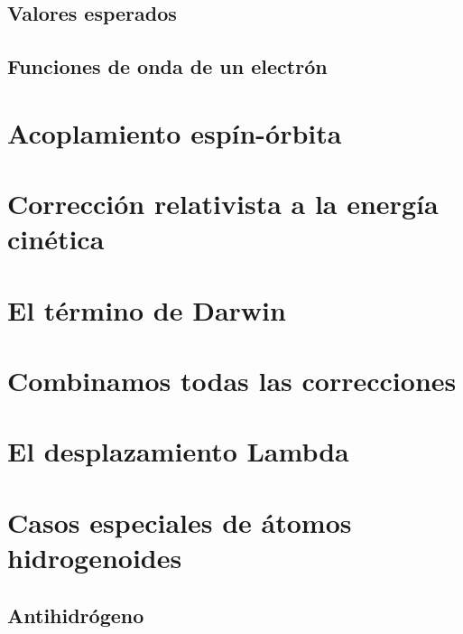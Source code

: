 \subsection{Valores esperados}

\subsection{Funciones de onda de un electrón}

\section{Acoplamiento espín-órbita}
 
\section{Corrección relativista a la energía cinética}

\section{El término de Darwin}

\section{Combinamos todas las correcciones}

\section{El desplazamiento Lambda}

\section{Casos especiales de átomos hidrogenoides}

\subsection{Antihidrógeno}
